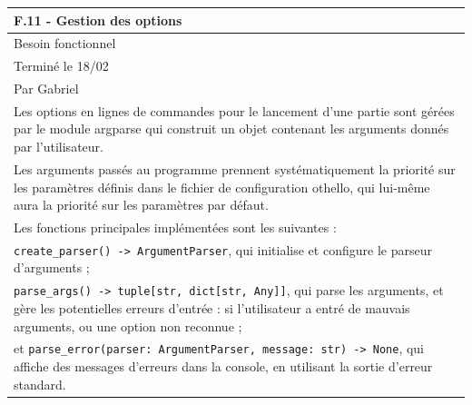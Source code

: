 \documentclass[a4paper,12pt]{article}
\begin{document}
\vspace{1cm}

\noindent
\setlength{\arrayrulewidth}{1.5pt}
\renewcommand{\arraystretch}{1.5}
\begin{tabularx}{\textwidth}{|X|}
    \hline
    \textbf{F.11 - Gestion des options}                                                                                                                                             \\
    \hline
    Besoin fonctionnel                                                                                                                                                              \\
    \hline
    Terminé le 18/02                                                                                                                                                                \\
    Par Gabriel                                                                                                                                                                     \\
    \hline
    Les options en lignes de commandes pour le lancement d’une partie sont gérées par le module argparse qui construit un objet contenant les arguments donnés par l’utilisateur.   \\
    Les arguments passés au programme prennent systématiquement la priorité sur les
    paramètres définis dans le fichier de configuration othello, qui lui-même aura la priorité
    sur les paramètres par défaut.                                                                                                                                                  \\

    Les fonctions principales implémentées sont les suivantes :                                                                                                                     \\
    \texttt{create\_parser() -> ArgumentParser}, qui initialise et configure le
    parseur d’arguments ;                                                                                                                                                           \\ \texttt{parse\_args() -> tuple[str, dict[str, Any]]},
    qui parse les arguments, et gère les potentielles erreurs d’entrée : si
    l’utilisateur a entré de mauvais arguments, ou une option non reconnue ;                                                                                                        \\ et
    \texttt{parse\_error(parser: ArgumentParser, message: str) -> None}, qui
    affiche des messages d’erreurs dans la console, en utilisant la sortie d’erreur
    standard.                                                                                                                                                                       \\


\end{tabularx}
\end{document}
